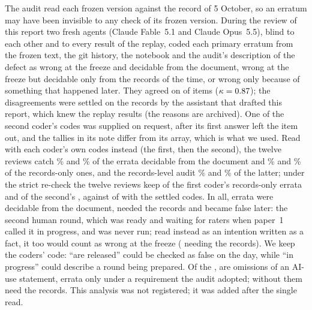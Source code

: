 \documentclass[11pt]{article}
\begin{document}
The audit read each frozen version against the record of 5 October, so an erratum may have been invisible to any check of its
frozen version. During the review of this report two fresh agents (Claude Fable~5.1 and Claude Opus~5.5), blind to each other and
to every result of the replay, coded each primary erratum from the frozen text, the git history, the notebook and the audit's description of the
defect as wrong at the freeze and decidable from the document, wrong at the freeze but decidable only from the records of the time, or wrong only because
of something that happened later. They agreed on \FreezeAgree{} of \NrefPrimary{} items ($\kappa=0.87$); the
\FreezeAdjudicated{} disagreements were settled on the records by the assistant that drafted this report, which knew the replay
results (the reasons are archived). One of the second coder's codes was supplied on request, after its first answer left the item
out, and the tallies in its note differ from its array, which is what we used. Read with each coder's own codes instead (the first,
then the second), the twelve reviews catch \RecConeDocPctCoderA\% and \RecConeDocPctCoderB\% of the errata decidable from the document and
\RecConeRecPctCoderA\% and \RecConeRecPctCoderB\% of the records-only ones, and the records-level audit \RecCtwoRecPctCoderA\% and
\RecCtwoRecPctCoderB\% of the latter; under the strict re-check the twelve reviews keep \StrictRecConeRecCoderA{} of the first coder's
\NfreezeRecCoderA{} records-only errata and \StrictRecConeRecCoderB{} of the second's \NfreezeRecCoderB, against \StrictRecConeRec{} of
\NfreezeRec{} with the settled codes. In all, \NfreezeDoc{} errata were decidable from the document, \NfreezeRec{}
needed the records and \NfreezeLater{} became false later: the second human round, which was ready and waiting for raters when paper~1
called it in progress, and was never run; read instead as an intention written as a fact, it too would count as wrong at the
freeze (\NfreezeRecAlt{} needing the records). We keep the coders' code: ``are released'' could be checked as false on the day,
while ``in progress'' could describe a round being prepared. Of the \NfreezeRec{}, \NnormDep{} are omissions of an AI-use statement, errata
only under a requirement the audit adopted; without them \NfreezeRecNoNorm{} need the records. This analysis was not registered;
it was added after the single read.
\end{document}
